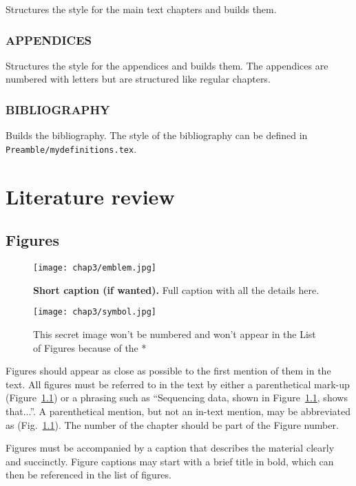 Structures the style for the main text chapters and builds them. 

\subsection{APPENDICES}

Structures the style for the appendices and builds them. The appendices are numbered with letters but are structured like regular chapters.

\subsection{BIBLIOGRAPHY}

Builds the bibliography. The style of the bibliography can be defined in \texttt{Preamble/mydefinitions.tex}.
\chapter{Literature review} \label{ch-3}

\section{Figures}

\begin{figure}
\center
\texttt{[image: chap3/emblem.jpg]} 
\caption[Short caption for List of Figures]{{\bfseries Short caption (if wanted).} Full caption with all the details here.}
\label{fig-example}
\end{figure}

\begin{figure}
\center
\texttt{[image: chap3/symbol.jpg]} 
\caption*{This secret image won't be numbered and won't appear in the List of Figures because of the *}
\end{figure}

Figures should appear as close as possible to the first mention of them in the text. All figures must be referred to in the text by either a parenthetical mark-up (Figure~\ref{fig-example}) or a phrasing such as ``Sequencing data, shown in Figure~\ref{fig-example}, shows that...''.  A parenthetical mention, but not an in-text mention, may be abbreviated as (Fig.~\ref{fig-example}).  The number of the chapter should be part of the Figure number.

Figures must be accompanied by a caption that describes the material clearly and succinctly. Figure captions may start with a brief title in bold, which can then be referenced in the list of figures. 

